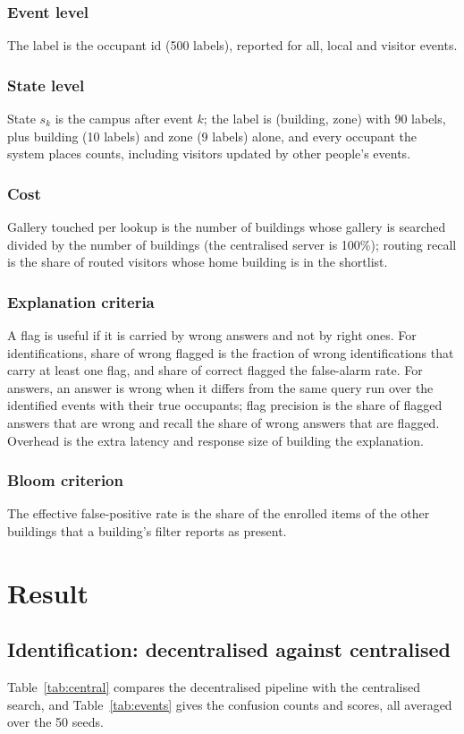 \documentclass[12pt,a4paper,oneside]{report}
\begin{document}
\subsubsection{Event level}
The label is the occupant id (500 labels), reported for all, local and visitor events.

\subsubsection{State level}
State $s_k$ is the campus after event $k$; the label is (building, zone) with 90 labels, plus building (10 labels) and zone (9 labels) alone, and every occupant the system places counts, including visitors updated by other people's events.

\subsubsection{Cost}
Gallery touched per lookup is the number of buildings whose gallery is searched divided by the number of buildings (the centralised server is 100\%); routing recall is the share of routed visitors whose home building is in the shortlist.

\subsubsection{Explanation criteria}
A flag is useful if it is carried by wrong answers and not by right ones. For identifications, share of wrong flagged is the fraction of wrong identifications that carry at least one flag, and share of correct flagged the false-alarm rate. For answers, an answer is wrong when it differs from the same query run over the identified events with their true occupants; flag precision is the share of flagged answers that are wrong and recall the share of wrong answers that are flagged. Overhead is the extra latency and response size of building the explanation.

\subsubsection{Bloom criterion}
The effective false-positive rate is the share of the enrolled items of the other buildings that a building's filter reports as present.

\section{Result}
\subsection{Identification: decentralised against centralised}\label{sec:res-events}
Table~\ref{tab:central} compares the decentralised pipeline with the centralised search, and Table~\ref{tab:events} gives the confusion counts and scores, all averaged over the 50 seeds.
\end{document}

